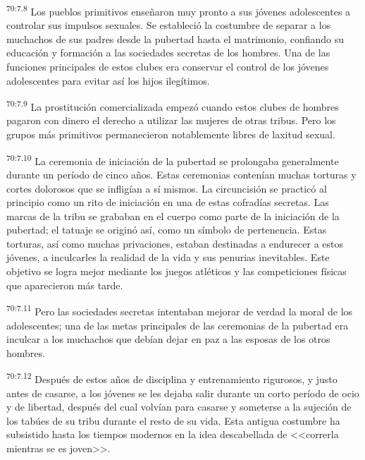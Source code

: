 \documentclass[twoside, 11pt]{book}
\begin{document}
\par
\textsuperscript{70:7.8} Los pueblos primitivos enseñaron muy pronto a sus jóvenes adolescentes a controlar sus impulsos sexuales. Se estableció la costumbre de separar a los muchachos de sus padres desde la pubertad hasta el matrimonio, confiando su educación y formación a las sociedades secretas de los hombres. Una de las funciones principales de estos clubes era conservar el control de los jóvenes adolescentes para evitar así los hijos ilegítimos.

\par
\textsuperscript{70:7.9} La prostitución comercializada empezó cuando estos clubes de hombres pagaron con dinero el derecho a utilizar las mujeres de otras tribus. Pero los grupos más primitivos permanecieron notablemente libres de laxitud sexual.

\par
\textsuperscript{70:7.10} La ceremonia de iniciación de la pubertad se prolongaba generalmente durante un período de cinco años. Estas ceremonias contenían muchas torturas y cortes dolorosos que se infligían a sí mismos. La circuncisión se practicó al principio como un rito de iniciación en una de estas cofradías secretas. Las marcas de la tribu se grababan en el cuerpo como parte de la iniciación de la pubertad; el tatuaje se originó así, como un símbolo de pertenencia. Estas torturas, así como muchas privaciones, estaban destinadas a endurecer a estos jóvenes, a inculcarles la realidad de la vida y sus penurias inevitables. Este objetivo se logra mejor mediante los juegos atléticos y las competiciones físicas que aparecieron más tarde.

\par
\textsuperscript{70:7.11} Pero las sociedades secretas intentaban mejorar de verdad la moral de los adolescentes; una de las metas principales de las ceremonias de la pubertad era inculcar a los muchachos que debían dejar en paz a las esposas de los otros hombres.

\par
\textsuperscript{70:7.12} Después de estos años de disciplina y entrenamiento rigurosos, y justo antes de casarse, a los jóvenes se les dejaba salir durante un corto período de ocio y de libertad, después del cual volvían para casarse y someterse a la sujeción de los tabúes de su tribu durante el resto de su vida. Esta antigua costumbre ha subsistido hasta los tiempos modernos en la idea descabellada de <<correrla mientras se es joven>>.
\end{document}
